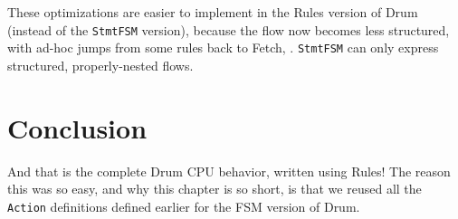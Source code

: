 These optimizations are easier to implement in the Rules version of
Drum (instead of the \verb|StmtFSM| version), because the flow now
becomes less structured, with ad-hoc jumps from some rules back to
Fetch, {\etc}.  \verb|StmtFSM| can only express structured,
properly-nested flows.




\section{Conclusion}

And that is the complete Drum CPU behavior, written using Rules!  The
reason this was so easy, and why this chapter is so short, is that we
reused all the \verb|Action| definitions defined earlier for the FSM
version of Drum.

